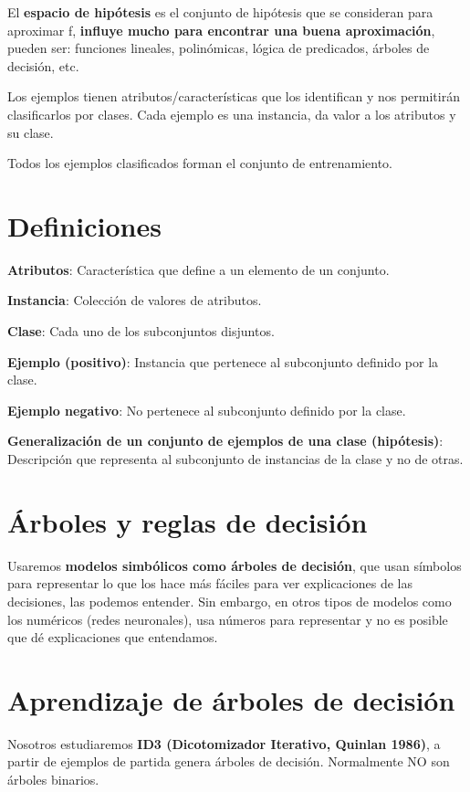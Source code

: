 \documentclass[12pt, twoside, openright]{report} %
\begin{document}
El \textbf{espacio de hipótesis} es el conjunto de hipótesis que se consideran para aproximar f, \textbf{influye mucho para encontrar una
buena aproximación}, pueden ser: funciones lineales, polinómicas, lógica de predicados, árboles de decisión, etc.

Los ejemplos tienen atributos/características que los identifican y nos permitirán clasificarlos por clases. Cada ejemplo es una instancia, da valor a los atributos y su clase.

Todos los ejemplos clasificados forman el conjunto de entrenamiento.

\section{Definiciones}

\textbf{Atributos}: Característica que define a un elemento de un conjunto.

\textbf{Instancia}: Colección de valores de atributos.

\textbf{Clase}: Cada uno de los subconjuntos disjuntos.

\textbf{Ejemplo (positivo)}: Instancia que pertenece al subconjunto definido por la clase.

\textbf{Ejemplo negativo}: No pertenece al subconjunto definido por la clase.

\textbf{Generalización de un conjunto de ejemplos de una clase (hipótesis)}: Descripción que representa al subconjunto de instancias de la clase y no de otras.

\section{Árboles y reglas de decisión}

Usaremos \textbf{modelos simbólicos como árboles de decisión}, que usan símbolos para representar lo que los hace más fáciles para ver explicaciones de las decisiones, las podemos entender. Sin embargo, en otros tipos de modelos como los numéricos (redes neuronales), usa números para representar y no es posible que dé explicaciones que entendamos.

\section{Aprendizaje de árboles de
decisión}

Nosotros estudiaremos \textbf{ID3 (Dicotomizador Iterativo, Quinlan 1986)}, a partir de ejemplos de partida genera árboles de decisión. Normalmente NO son árboles binarios.
\end{document}
